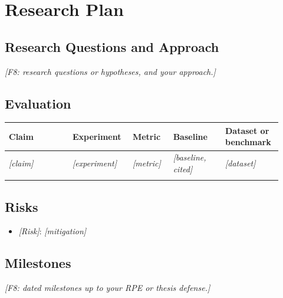 
\section{Research Plan}

\subsection{Research Questions and Approach}
\textit{[F8: research questions or hypotheses, and your approach.]}

\subsection{Evaluation}
\begin{longtable}{@{}p{0.22\linewidth}p{0.2\linewidth}p{0.14\linewidth}p{0.18\linewidth}p{0.18\linewidth}@{}}
  \toprule
  Claim & Experiment & Metric & Baseline & Dataset or benchmark \\
  \midrule
  \endhead
  \textit{[claim]} & \textit{[experiment]} & \textit{[metric]} & \textit{[baseline, cited]} & \textit{[dataset]} \\
   & &&& \\
  \bottomrule
\end{longtable}

\subsection{Risks}
\begin{itemize}
  \item \textit{[Risk]}: \textit{[mitigation]}
\end{itemize}

\subsection{Milestones}
\textit{[F8: dated milestones up to your RPE or thesis defense.]}

